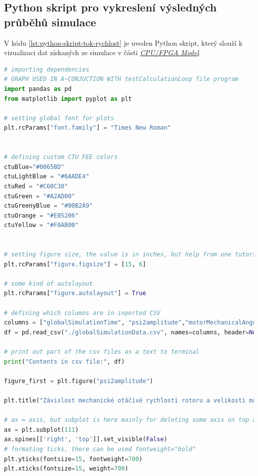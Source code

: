 \documentclass[a4paper, twoside, 11pt]{article}
\begin{document}
\begin{appendices}
	\section{Python skript pro vykreslení výsledných průběhů simulace}
	V kódu \ref{lst:python-skript-tok-rychlost} je uveden Python skript, který slouží k vizualizaci dat získaných ze simulace v části \hyperref[subsec:cpu-fpga]{\textit{CPU/FPGA Model}}.
	\begin{lstlisting}[language={python}, caption={Ukázka python skriptu pro vykreslení časové závislosti mechanické otáčivé rychlosti rotoru $\Omega$ a velikosti magnetického toku rotoru \gls{symbol:psi2}.}, label={lst:python-skript-tok-rychlost}]
# importing dependencies
# GRAPH USED IN A~CONJUCTION WITH testCalculationLoop file program
import pandas as pd
from matplotlib import pyplot as plt

# setting global font for plots
plt.rcParams["font.family"] = "Times New Roman"


# defining custom CTU FEE colors
ctuBlue="#0065BD"
ctuLightBlue = "#6AADE4"
ctuRed = "#C60C30"
ctuGreen = "#A2AD00"
ctuGreenyBlue = "#00B2A9"
ctuOrange = "#E05206"
ctuYellow = "#F0AB00"


# setting figure size, the value is in inches, but help from one tutorial gives info, that because of dpi it translates to pixels like inches * 100 = pixels
plt.rcParams["figure.figsize"] = [15, 6]

# some kind of autolayout
plt.rcParams["figure.autolayout"] = True

# defining which columns are in inported CSV
columns = ["globalSimulationTime", "psi2amplitude","motorMechanicalAngularVelocity", "idRegulatorMeasuredValue", "idRegulatorWantedValue", "velocityRegulatorWantedValue", "velocityRegulatorSaturationOutput", "velocityRegulatorClampingStatus", "fluxRegulatorISum"]
df = pd.read_csv("./globalSimulationData.csv", names=columns, header=None, skiprows=0, nrows=10000000)

# print out part of the csv files as a text to terminal
print("Contents in csv file:", df)

figure_first = plt.figure("psi2amplitude")

plt.title("Závislost mechanické otáčivé rychlosti rotoru a velikosti magnetického toku rotoru na čase", fontsize=22, fontweight=700)

# ax = axis, but subplot is here mainly for deleting some axis on top and right
ax = plt.subplot(111)
ax.spines[['right', 'top']].set_visible(False)
# formating ticks, there can be used fontweight="bold"
plt.yticks(fontsize=15, fontweight=700)
plt.xticks(fontsize=15, weight=700)


\end{lstlisting}
\end{appendices}
\end{document}
